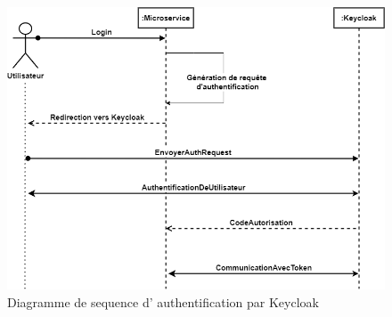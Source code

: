 \documentclass[a4paper, 11pt, openany]{report}
\begin{document}
\begin{figure}[H]
\centering
\includegraphics[width=\textwidth]{keycloak-seq.png} 
\caption{Diagramme de sequence d' authentification par Keycloak}
\label{fig:s2_auth}
\end{figure}
\end{document}
